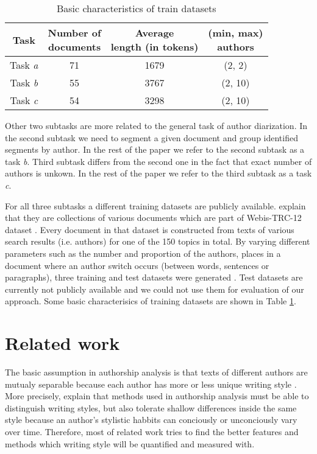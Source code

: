\documentclass[10pt, a4paper]{article}
\begin{document}
\begin{table}
	\caption{Basic characteristics of train datasets}
	\label{table-1}
	\begin{center}
		\begin{tabular}{cccc}
			\toprule
			Task & \thead{Number of \\ documents} & \thead{Average \\ length (in tokens)} & \thead{(min, max)\\authors} \\
			\midrule
			Task \textit{a} & 71 & 1679 & (2, 2)\\
			Task \textit{b} & 55 & 3767 & (2, 10)\\
			Task \textit{c} & 54 & 3298 & (2, 10)\\
			\bottomrule
		\end{tabular}
	\end{center}
\end{table}

Other two subtasks are more related to the general task of author diarization. In the second subtask we need to segment a given document and group identified segments by author. In the rest of the paper we refer to the second subtask as a task \textit{b}. Third subtask differs from the second one in the fact that exact number of authors is unkown. In the rest of the paper we refer to the third subtask as a task \textit{c}.

For all three subtasks a different training datasets are publicly available\footnotemark[1]. \citet{rosso-2016} explain that they are collections of various documents which are part of Webis-TRC-12 dataset \citep{potthast-2013}. Every document in that dataset is constructed from texts of various search results (i.e. authors) for one of the 150 topics in total. By varying different parameters such as the number and proportion of the authors, places in a document where an author switch occurs (between words, sentences or paragraphs), three training and test datasets were generated \citep{rosso-2016}. Test datasets are currently not publicly available and we could not use them for evaluation of our approach. Some basic characterisics of training datasets are shown in Table \ref{table-1}.


\section{Related work}
The basic assumption in authorship analysis is that texts of different authors are mutualy separable because each author has more or less unique writing style \citep{stamatatos-2009a,ding-2016}. More precisely, \citet{koppel-2009} explain that methods used in authorship analysis must be able to distinguish writing styles, but also tolerate shallow differences inside the same style because an author's stylistic habbits can conciously or unconciously vary over time. Therefore, most of related work tries to find the better features and methods which writing style will be quantified and measured with.
\end{document}
